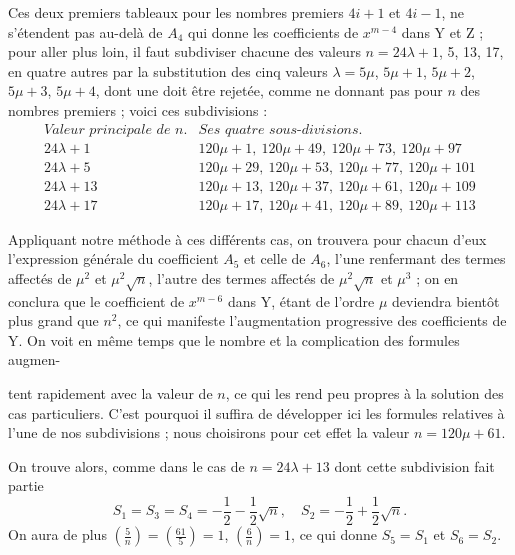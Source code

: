 \documentclass[11pt,a4paper]{article}
\begin{document}
Ces deux premiers tableaux pour les nombres premiers $4i + 1$ et $4i - 1$,
ne s'étendent pas au-delà de $A_4$ qui donne les coefficients de $x^{m-4}$
dans Y et Z ; pour aller plus loin, il faut subdiviser chacune des valeurs
$n = 24\lambda + 1$, 5, 13, 17, en quatre autres par la substitution des
cinq valeurs $\lambda = 5\mu$, $5\mu + 1$, $5\mu + 2$, $5\mu + 3$, $5\mu + 4$,
dont une doit être rejetée, comme ne donnant pas pour $n$ des nombres
premiers ; voici ces subdivisions :
\[
\begin{array}{c|l}
\textit{Valeur principale de } n. & \textit{Ses quatre sous-divisions.} \\ \hline
24\lambda + 1 & 120\mu + 1,\ 120\mu + 49,\ 120\mu + 73,\ 120\mu + 97 \\
24\lambda + 5 & 120\mu + 29,\ 120\mu + 53,\ 120\mu + 77,\ 120\mu + 101 \\
24\lambda + 13 & 120\mu + 13,\ 120\mu + 37,\ 120\mu + 61,\ 120\mu + 109 \\
24\lambda + 17 & 120\mu + 17,\ 120\mu + 41,\ 120\mu + 89,\ 120\mu + 113
\end{array}
\]

Appliquant notre méthode à ces différents cas, on trouvera pour chacun d'eux
l'expression générale du coefficient $A_5$ et celle de $A_6$, l'une
renfermant des termes affectés de $\mu^2$ et $\mu^2\sqrt{n}$, l'autre des
termes affectés de $\mu^2\sqrt{n}$ et $\mu^3$ ; on en conclura que le
coefficient de $x^{m-6}$ dans Y, étant de l'ordre $\mu$ deviendra bientôt
plus grand que $n^2$, ce qui manifeste l'augmentation progressive des
coefficients de Y. On voit en même temps que le nombre et la complication
des formules augmen-


tent rapidement avec la valeur de $n$, ce qui les rend peu propres à la
solution des cas particuliers. C'est pourquoi il suffira de développer ici
les formules relatives à l'une de nos subdivisions ; nous choisirons pour
cet effet la valeur $n = 120\mu + 61$.

On trouve alors, comme dans le cas de $n = 24\lambda + 13$ dont cette
subdivision fait partie
\[
S_1 = S_3 = S_4 = -\frac{1}{2} - \frac{1}{2}\sqrt{n},\quad S_2 = -\frac{1}{2} + \frac{1}{2}\sqrt{n}.
\]
On aura de plus $\left(\frac{5}{n}\right) = \left(\frac{61}{5}\right) = 1$,
$\left(\frac{6}{n}\right) = 1$, ce qui donne $S_5 = S_1$ et $S_6 = S_2$.
\end{document}
